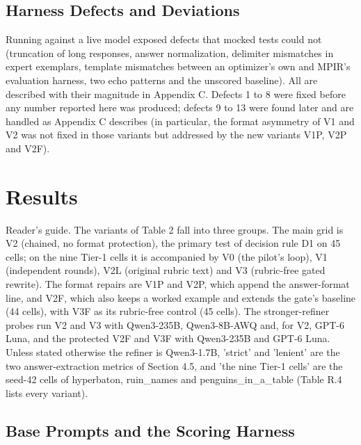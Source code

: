 \documentclass{ieeeaccess}
\begin{document}
\subsection{Harness Defects and Deviations}

Running against a live model exposed defects that mocked tests could not (truncation of long responses, answer normalization, delimiter mismatches in expert exemplars, template mismatches between an optimizer's own and MPIR's evaluation harness, two echo patterns and the unscored baseline). All are described with their magnitude in Appendix C. Defects 1 to 8 were fixed before any number reported here was produced; defects 9 to 13 were found later and are handled as Appendix C describes (in particular, the format asymmetry of V1 and V2 was not fixed in those variants but addressed by the new variants V1P, V2P and V2F).

\section{Results}

Reader's guide. The variants of Table 2 fall into three groups. The main grid is V2 (chained, no format protection), the primary test of decision rule D1 on 45 cells; on the nine Tier-1 cells it is accompanied by V0 (the pilot's loop), V1 (independent rounds), V2L (original rubric text) and V3 (rubric-free gated rewrite). The format repairs are V1P and V2P, which append the answer-format line, and V2F, which also keeps a worked example and extends the gate's baseline (44 cells), with V3F as its rubric-free control (45 cells). The stronger-refiner probes run V2 and V3 with Qwen3-235B, Qwen3-8B-AWQ and, for V2, GPT-6 Luna, and the protected V2F and V3F with Qwen3-235B and GPT-6 Luna. Unless stated otherwise the refiner is Qwen3-1.7B, 'strict' and 'lenient' are the two answer-extraction metrics of Section 4.5, and 'the nine Tier-1 cells' are the seed-42 cells of hyperbaton, ruin\_\allowbreak{}names and penguins\_\allowbreak{}in\_\allowbreak{}a\_\allowbreak{}table (Table R.4 lists every variant).

\subsection{Base Prompts and the Scoring Harness}
\end{document}
